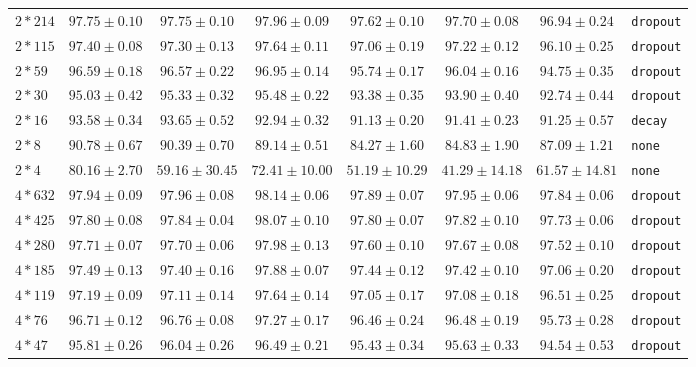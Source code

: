 \documentclass[conference]{IEEEtran}
\begin{document}
\begin{longtable}{@{}lccccccl@{}}
$2*214$ & $97.75 \pm 0.10$ & $97.75 \pm 0.10$ & \bfseries $97.96 \pm 0.09$ & $97.62 \pm 0.10$ & $97.70 \pm 0.08$ & $96.94 \pm 0.24$ & \texttt{dropout} \\
$2*115$ & $97.40 \pm 0.08$ & $97.30 \pm 0.13$ & \bfseries $97.64 \pm 0.11$ & $97.06 \pm 0.19$ & $97.22 \pm 0.12$ & $96.10 \pm 0.25$ & \texttt{dropout} \\
$2*59$ & $96.59 \pm 0.18$ & $96.57 \pm 0.22$ & \bfseries $96.95 \pm 0.14$ & $95.74 \pm 0.17$ & $96.04 \pm 0.16$ & $94.75 \pm 0.35$ & \texttt{dropout} \\
$2*30$ & $95.03 \pm 0.42$ & $95.33 \pm 0.32$ & \bfseries $95.48 \pm 0.22$ & $93.38 \pm 0.35$ & $93.90 \pm 0.40$ & $92.74 \pm 0.44$ & \texttt{dropout} \\
$2*16$ & $93.58 \pm 0.34$ & \bfseries $93.65 \pm 0.52$ & $92.94 \pm 0.32$ & $91.13 \pm 0.20$ & $91.41 \pm 0.23$ & $91.25 \pm 0.57$ & \texttt{decay} \\
$2*8$ & \bfseries $90.78 \pm 0.67$ & $90.39 \pm 0.70$ & $89.14 \pm 0.51$ & $84.27 \pm 1.60$ & $84.83 \pm 1.90$ & $87.09 \pm 1.21$ & \texttt{none} \\
$2*4$ & \bfseries $80.16 \pm 2.70$ & $59.16 \pm 30.45$ & $72.41 \pm 10.00$ & $51.19 \pm 10.29$ & $41.29 \pm 14.18$ & $61.57 \pm 14.81$ & \texttt{none} \\
$4*632$ & $97.94 \pm 0.09$ & $97.96 \pm 0.08$ & \bfseries $98.14 \pm 0.06$ & $97.89 \pm 0.07$ & $97.95 \pm 0.06$ & $97.84 \pm 0.06$ & \texttt{dropout} \\
$4*425$ & $97.80 \pm 0.08$ & $97.84 \pm 0.04$ & \bfseries $98.07 \pm 0.10$ & $97.80 \pm 0.07$ & $97.82 \pm 0.10$ & $97.73 \pm 0.06$ & \texttt{dropout} \\
$4*280$ & $97.71 \pm 0.07$ & $97.70 \pm 0.06$ & \bfseries $97.98 \pm 0.13$ & $97.60 \pm 0.10$ & $97.67 \pm 0.08$ & $97.52 \pm 0.10$ & \texttt{dropout} \\
$4*185$ & $97.49 \pm 0.13$ & $97.40 \pm 0.16$ & \bfseries $97.88 \pm 0.07$ & $97.44 \pm 0.12$ & $97.42 \pm 0.10$ & $97.06 \pm 0.20$ & \texttt{dropout} \\
$4*119$ & $97.19 \pm 0.09$ & $97.11 \pm 0.14$ & \bfseries $97.64 \pm 0.14$ & $97.05 \pm 0.17$ & $97.08 \pm 0.18$ & $96.51 \pm 0.25$ & \texttt{dropout} \\
$4*76$ & $96.71 \pm 0.12$ & $96.76 \pm 0.08$ & \bfseries $97.27 \pm 0.17$ & $96.46 \pm 0.24$ & $96.48 \pm 0.19$ & $95.73 \pm 0.28$ & \texttt{dropout} \\
$4*47$ & $95.81 \pm 0.26$ & $96.04 \pm 0.26$ & \bfseries $96.49 \pm 0.21$ & $95.43 \pm 0.34$ & $95.63 \pm 0.33$ & $94.54 \pm 0.53$ & \texttt{dropout} \\

\end{longtable}
\end{document}
